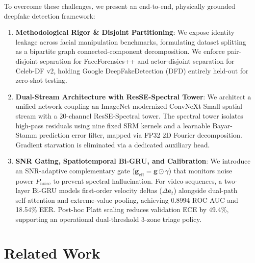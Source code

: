 \documentclass[10pt,twocolumn,letterpaper]{article}
\begin{document}
To overcome these challenges, we present an end-to-end, physically grounded deepfake detection framework:
\begin{enumerate}
\item \textbf{Methodological Rigor \& Disjoint Partitioning}: We expose identity leakage across facial manipulation benchmarks, formulating dataset splitting as a bipartite graph connected-component decomposition. We enforce pair-disjoint separation for FaceForensics++ and actor-disjoint separation for Celeb-DF v2, holding Google DeepFakeDetection (DFD) entirely held-out for zero-shot testing.
\item \textbf{Dual-Stream Architecture with ResSE-Spectral Tower}: We architect a unified network coupling an ImageNet-modernized ConvNeXt-Small spatial stream with a 20-channel ResSE-Spectral tower. The spectral tower isolates high-pass residuals using nine fixed SRM kernels and a learnable Bayar-Stamm prediction error filter, mapped via FP32 2D Fourier decomposition. Gradient starvation is eliminated via a dedicated auxiliary head.
\item \textbf{SNR Gating, Spatiotemporal Bi-GRU, and Calibration}: We introduce an SNR-adaptive complementary gate ($\mathbf{g}_{\mathrm{eff}} = \mathbf{g} \odot \gamma$) that monitors noise power $P_{\mathrm{noise}}$ to prevent spectral hallucination. For video sequences, a two-layer Bi-GRU models first-order velocity deltas ($\Delta \mathbf{e}_t$) alongside dual-path self-attention and extreme-value pooling, achieving 0.8994 ROC AUC and 18.54\% EER. Post-hoc Platt scaling reduces validation ECE by 49.4\%, supporting an operational dual-threshold 3-zone triage policy.
\end{enumerate}

\section{Related Work}
\label{sec:relwork}
\end{document}

